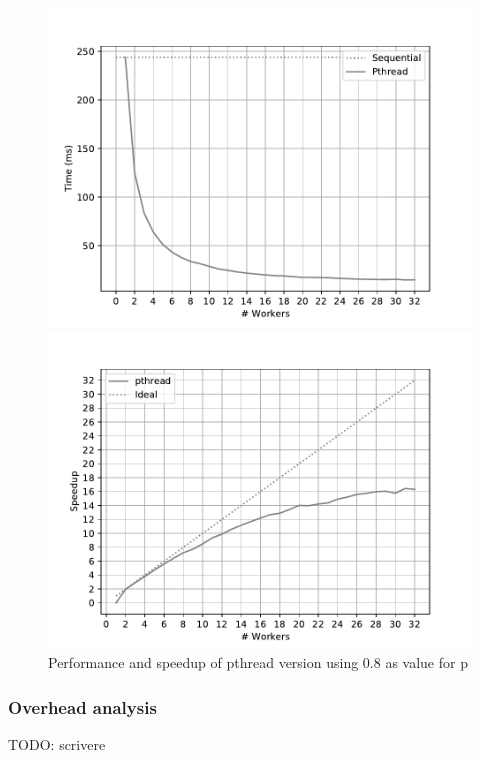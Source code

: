 \begin{figure}
    \centering
    \begin{minipage}{0.48\textwidth}
        \includegraphics[width=\textwidth]{plots/pthread_performance_08_time.pdf}
    \end{minipage}
    \begin{minipage}{0.48\textwidth}
        \includegraphics[width=\textwidth]{plots/pthread_speedup_08_time.pdf}
    \end{minipage}
    \caption{Performance and speedup of pthread version using 0.8 as value for p}
    \label{fig:pthread_08}
\end{figure}
\subsubsection{Overhead analysis}
TODO: scrivere
